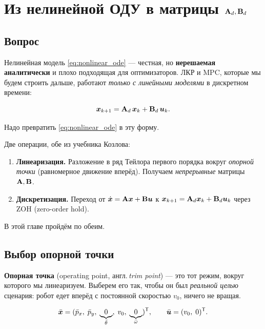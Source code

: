 \chapter{Из нелинейной ОДУ в матрицы $\mathbf{A}_d, \mathbf{B}_d$}
\label{ch:linearization}

\section{Вопрос}

Нелинейная модель \eqref{eq:nonlinear_ode} --- честная, но \textbf{нерешаемая
аналитически} и плохо подходящая для оптимизаторов. ЛКР и MPC, которые
мы будем строить дальше, работают \emph{только с линейными моделями}
в дискретном времени:

\[
  \bm{x}_{k+1} = \mathbf{A}_d\,\bm{x}_k + \mathbf{B}_d\,\bm{u}_k.
\]

Надо превратить \eqref{eq:nonlinear_ode} в эту форму.

\begin{ideabox}
Две операции, обе из учебника Козлова:
\begin{enumerate}
  \item \textbf{Линеаризация.} Разложение в ряд Тейлора первого порядка
        вокруг \emph{опорной точки} (равномерное движение вперёд).
        Получаем \emph{непрерывные} матрицы $\mathbf{A}, \mathbf{B}$.
  \item \textbf{Дискретизация.} Переход от $\dot{\bm{x}} = \mathbf{A}\bm{x}
        + \mathbf{B}\bm{u}$ к $\bm{x}_{k+1} = \mathbf{A}_d\bm{x}_k +
        \mathbf{B}_d\bm{u}_k$ через ZOH (zero-order hold).
\end{enumerate}
В этой главе пройдём по обеим.
\end{ideabox}

\section{Выбор опорной точки}

\textbf{Опорная точка} (operating point, англ.\,\emph{trim point}) --- это
тот режим, вокруг которого мы линеаризуем. Выберем его так, чтобы он
был \emph{реальной целью} сценария: робот едет вперёд с постоянной
скоростью $v_0$, ничего не вращая.

\begin{equation}
  \bar{\bm{x}} = (\bar{p}_x,\; \bar{p}_y,\; \underbrace{0}_{\bar\theta},\;
                    v_0,\; \underbrace{0}_{\bar\omega})^{\mathsf{T}},
  \qquad
  \bar{\bm{u}} = (v_0,\; 0)^{\mathsf{T}}.
  \label{eq:op_point}
\end{equation}

